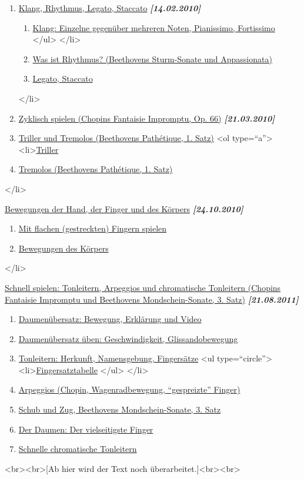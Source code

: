 \begin{enumerate} 
 \item \hyperlink{c1iii1}{Klang, Rhythmus, Legato, Staccato} \textbf{\textit{[14.02.2010]}}
  \begin{enumerate}[label={\alph*.}] 
   <li>\hyperlink{c1iii1a}{Was ist ein \enquote{Guter Klang}?}
   <ul type=\enquote{circle}>
    <li>\hyperlink{c1iii1a1}{Der Basisanschlag}
    \item \hyperlink{c1iii1a2}{Klang: Einzelne gegenüber mehreren Noten, Pianissimo, Fortissimo}
   </ul>
   </li>
   \item \hyperlink{c1iii1b}{Was ist Rhythmus? (Beethovens Sturm-Sonate und Appassionata)}
   \item \hyperlink{c1iii1c}{Legato, Staccato}
   \end{enumerate}
 </li>
 \item \hyperlink{c1iii2}{Zyklisch spielen (Chopins Fantaisie Impromptu, Op. 66)} \textbf{\textit{[21.03.2010]}}

 \item \hyperlink{c1iii3}{Triller und Tremolos (Beethovens Pathétique, 1. Satz)}
  <ol type=\enquote{a}>
   <li>\hyperlink{c1iii3}{Triller}
   \item \hyperlink{c1iii3b}{Tremolos (Beethovens Pathétique, 1. Satz)}
   \end{enumerate}
 </li>
 \item \hyperlink{c1iii4}{Bewegungen der Hand, der Finger und des Körpers} \textbf{\textit{[24.10.2010]}}
  \begin{enumerate}[label={\alph*.}] 
   <li>\hyperlink{c1iii4}{Bewegungen der Hand}
   \item \hyperlink{c1iii4b}{Mit flachen (gestreckten) Fingern spielen}
   \item \hyperlink{c1iii4c}{Bewegungen des Körpers}
   \end{enumerate}
 </li>
 \item \hyperlink{c1iii5}{Schnell spielen: Tonleitern, Arpeggios und chromatische Tonleitern (Chopins Fantaisie Impromptu und Beethovens Mondschein-Sonate, 3. Satz)} \textbf{\textit{[21.08.2011]}}
  \begin{enumerate}[label={\alph*.}] 
   <li>\hyperlink{c1iii5a}{Tonleitern: Daumenuntersatz, Daumenübersatz}
   \item \hyperlink{c1iii5b}{Daumenübersatz: Bewegung, Erklärung und Video}
   \item \hyperlink{c1iii5c}{Daumenübersatz üben: Geschwindigkeit, Glissandobewegung}
   \item \hyperlink{c1iii5d}{Tonleitern: Herkunft, Namensgebung, Fingersätze}
    <ul type=\enquote{circle}>
     <li>\hyperlink{table}{Fingersatztabelle}
    </ul>
   </li>
   \item \hyperlink{c1iii5e}{Arpeggios (Chopin, Wagenradbewegung, \enquote{gespreizte} Finger)}
   \item \hyperlink{c1iii5f}{Schub und Zug, Beethovens Mondschein-Sonate, 3. Satz}
   \item \hyperlink{c1iii5g}{Der Daumen: Der vielseitigste Finger}
   \item \hyperlink{c1iii5h}{Schnelle chromatische Tonleitern}
   \end{enumerate}<br><br>[Ab hier wird der Text noch überarbeitet.]<br><br>
